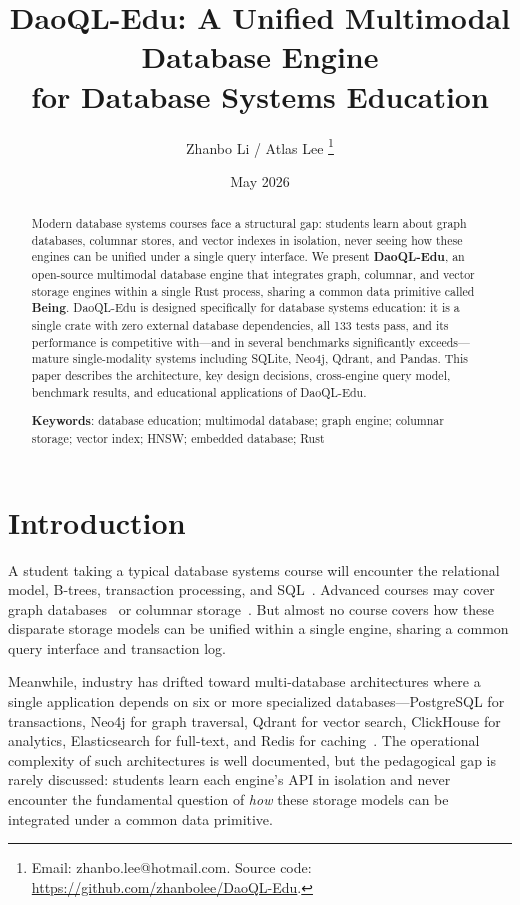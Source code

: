 \documentclass[11pt,a4paper]{article}
\title{DaoQL-Edu: A Unified Multimodal Database Engine\\for Database Systems Education}
\author{Zhanbo Li / Atlas Lee%
\thanks{Email: zhanbo.lee@hotmail.com. Source code: \url{https://github.com/zhanbolee/DaoQL-Edu}.}}
\affil{DAO Project}
\date{May 2026}
\begin{document}
\maketitle

\begin{abstract}
Modern database systems courses face a structural gap: students learn about
graph databases, columnar stores, and vector indexes in isolation, never
seeing how these engines can be unified under a single query interface.
We present \textbf{DaoQL-Edu}, an open-source multimodal database engine
that integrates graph, columnar, and vector storage engines within a single
Rust process, sharing a common data primitive called \textbf{Being}.
DaoQL-Edu is designed specifically for database systems education: it is a
single crate with zero external database dependencies, all 133 tests pass,
and its performance is competitive with---and in several benchmarks
significantly exceeds---mature single-modality systems including SQLite,
Neo4j, Qdrant, and Pandas. This paper describes the architecture, key design
decisions, cross-engine query model, benchmark results, and educational
applications of DaoQL-Edu.

\textbf{Keywords}: database education; multimodal database; graph engine;
columnar storage; vector index; HNSW; embedded database; Rust
\end{abstract}

\section{Introduction}

A student taking a typical database systems course will encounter the
relational model, B-trees, transaction processing, and SQL~\cite{codd1970}.
Advanced courses may cover graph databases~\cite{angles2008} or columnar
storage~\cite{abadi2008}. But almost no course covers how these
disparate storage models can be unified within a single engine, sharing a
common query interface and transaction log.

Meanwhile, industry has drifted toward multi-database architectures where a
single application depends on six or more specialized databases---PostgreSQL
for transactions, Neo4j for graph traversal, Qdrant for vector search,
ClickHouse for analytics, Elasticsearch for full-text, and Redis for
caching~\cite{stonebraker2007}. The operational complexity of such
architectures is well documented, but the pedagogical gap is rarely
discussed: students learn each engine's API in isolation and never encounter
the fundamental question of \emph{how} these storage models can be
integrated under a common data primitive.
\end{document}
